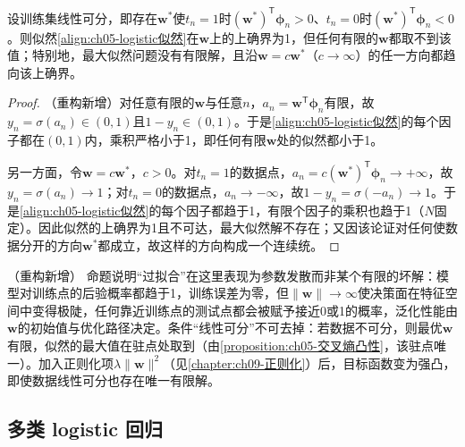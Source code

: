 \documentclass[../../main.tex]{subfiles}
\begin{document}
\begin{proposition}[线性可分数据的最大似然问题无有限解]\label{proposition:ch05-线性可分最大似然}
设训练集线性可分，即存在$\boldsymbol{w}^{*}$使$t_n=1$时$(\boldsymbol{w}^{*})^{\mathsf{T}}\boldsymbol{\phi}_n>0$、$t_n=0$时$(\boldsymbol{w}^{*})^{\mathsf{T}}\boldsymbol{\phi}_n<0$。则似然\eqref{align:ch05-logistic似然}在$\boldsymbol{w}$上的上确界为1，但任何有限的$\boldsymbol{w}$都取不到该值；特别地，最大似然问题没有有限解，且沿$\boldsymbol{w}=c\boldsymbol{w}^{*}$（$c\to\infty$）的任一方向都趋向该上确界。
\end{proposition}

\begin{proof}
（重构新增）对任意有限的$\boldsymbol{w}$与任意$n$，$a_n=\boldsymbol{w}^{\mathsf{T}}\boldsymbol{\phi}_n$有限，故$y_n=\sigma(a_n)\in(0,1)$且$1-y_n\in(0,1)$。于是\eqref{align:ch05-logistic似然}的每个因子都在$(0,1)$内，乘积严格小于1，即任何有限$\boldsymbol{w}$处的似然都小于1。

另一方面，令$\boldsymbol{w}=c\boldsymbol{w}^{*}$，$c>0$。对$t_n=1$的数据点，$a_n=c(\boldsymbol{w}^{*})^{\mathsf{T}}\boldsymbol{\phi}_n\to+\infty$，故$y_n=\sigma(a_n)\to1$；对$t_n=0$的数据点，$a_n\to-\infty$，故$1-y_n=\sigma(-a_n)\to1$。于是\eqref{align:ch05-logistic似然}的每个因子都趋于1，有限个因子的乘积也趋于1（$N$固定）。因此似然的上确界为1且不可达，最大似然解不存在；又因该论证对任何使数据分开的方向$\boldsymbol{w}^{*}$都成立，故这样的方向构成一个连续统。
\end{proof}

\begin{remark}（重构新增）
命题说明“过拟合”在这里表现为参数发散而非某个有限的坏解：模型对训练点的后验概率都趋于1，训练误差为零，但$\lVert\boldsymbol{w}\rVert\to\infty$使决策面在特征空间中变得极陡，任何靠近训练点的测试点都会被赋予接近0或1的概率，泛化性能由$\boldsymbol{w}$的初始值与优化路径决定。条件“线性可分”不可去掉：若数据不可分，则最优$\boldsymbol{w}$有限，似然的最大值在驻点处取到（由\cref{proposition:ch05-交叉熵凸性}，该驻点唯一）。加入正则化项$\lambda\lVert\boldsymbol{w}\rVert^{2}$（见\cref{chapter:ch09-正则化}）后，目标函数变为强凸，即使数据线性可分也存在唯一有限解。
\end{remark}

\subsection{多类 logistic 回归}\label{subsection:ch05-多类logistic回归}
\end{document}

